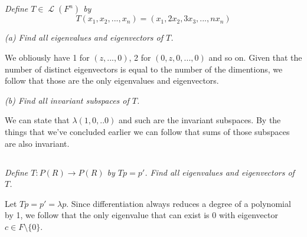 \documentclass[11pt,oneside,titlepage]{book}
\DeclareMathOperator \map {\mathcal {L}}
\DeclareMathOperator \Span {span}
\begin{document}
\subsection{}

\textit{Define $T \in \map(F^n)$ by}
$$T(x_1, x_2,  ..., x_n) = (x_1, 2x_2, 3x_3, ..., nx_n)$$

\textit{(a) Find all eigenvalues and eigenvectors of $T$.}

We obliously have 1 for $(z, ..., 0)$, 2 for $(0, z, 0, ..., 0)$ and so on. Given that
the number of distinct eigenvectors is equal to the number of the dimentions, we follow that
those are the only eigenvalues and eigenvectors.

\textit{(b) Find all invariant subspaces of $T$.}

We can state that $\lambda (1, 0, .. 0)$ and such are the invariant subspaces. By the
things that we've concluded earlier we can follow that sums of those subspaces are
also invariant.



\subsection{}

\textit{Define $T: P(R) \to P(R)$ by $Tp = p'$. Find all eigenvalues and eigenvectors of $T$.}

Let $Tp = p' = \lambda p$. Since differentiation always reduces a degree of a polynomial by 1,
we follow that the only eigenvalue that can exist is 0 with eigenvector $c \in F \setminus \{0\}$.

\subsection{}
\end{document}
